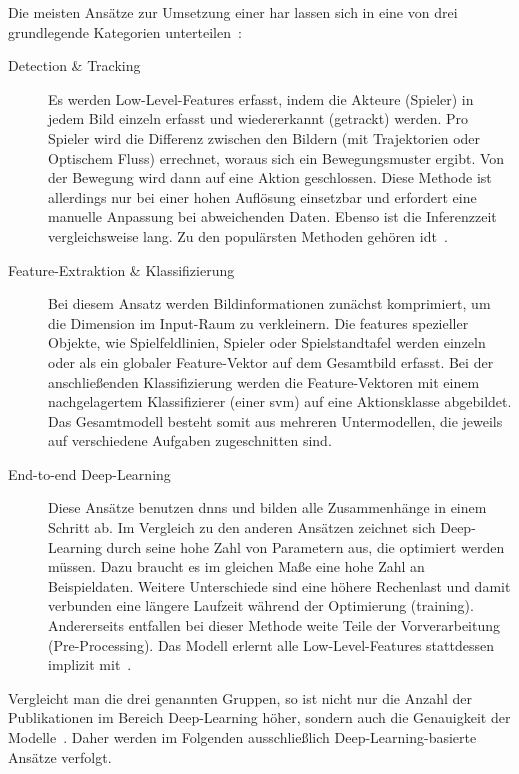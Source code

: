 Die meisten Ansätze zur Umsetzung einer \gls{har} lassen sich in eine von drei grundlegende Kategorien unterteilen~\cite{Rahmad18, Kothawade19}:

\begin{description}
    \item[Detection \& Tracking]
    Es werden Low-Level-Features erfasst, indem die Akteure (Spieler) in jedem Bild einzeln erfasst und wiedererkannt (getrackt) werden.
    Pro Spieler wird die Differenz zwischen den Bildern (\zB mit Trajektorien oder Optischem Fluss) errechnet, woraus sich ein Bewegungsmuster ergibt.
    Von der Bewegung wird dann auf eine Aktion geschlossen.
    Diese Methode ist allerdings nur bei einer hohen Auflösung einsetzbar und erfordert eine manuelle Anpassung bei abweichenden Daten.
    Ebenso ist die Inferenzzeit vergleichsweise lang.
    Zu den populärsten Methoden gehören \ua \gls{idt}~\cite{Wang13}.
    \item[Feature-Extraktion \& Klassifizierung]
    Bei diesem Ansatz werden Bildinformationen zunächst komprimiert, um die Dimension im Input-Raum zu verkleinern.
    Die \gls{feature}s spezieller Objekte, wie Spielfeldlinien, Spieler oder Spielstandtafel werden einzeln oder als ein globaler Feature-Vektor auf dem Gesamtbild erfasst.
    Bei der anschließenden Klassifizierung werden die Feature-Vektoren mit einem nachgelagertem Klassifizierer (\zB einer \gls{svm}) auf eine Aktionsklasse abgebildet.
    Das Gesamtmodell besteht somit aus mehreren Untermodellen, die jeweils auf verschiedene Aufgaben zugeschnitten sind.
    \item[End-to-end Deep-Learning]
    Diese Ansätze benutzen \glspl{dnn} und bilden alle Zusammenhänge in einem Schritt ab.
    Im Vergleich zu den anderen Ansätzen zeichnet sich Deep-Learning durch seine hohe Zahl von Parametern aus, die optimiert werden müssen.
    Dazu braucht es im gleichen Maße eine hohe Zahl an Beispieldaten.
    Weitere Unterschiede sind eine höhere Rechenlast und damit verbunden eine längere Laufzeit während der Optimierung (\gls{training}).
    Andererseits entfallen bei dieser Methode weite Teile der Vorverarbeitung (Pre-Processing).
    Das Modell erlernt alle Low-Level-Features stattdessen implizit mit~\cite{Rahmad18}.
\end{description}

Vergleicht man die drei genannten Gruppen, so ist nicht nur die Anzahl der Publikationen im Bereich Deep-Learning höher, sondern auch die Genauigkeit der Modelle~\cite{Rahmad18}.
Daher werden im Folgenden ausschließlich Deep-Learning-basierte Ansätze verfolgt.


